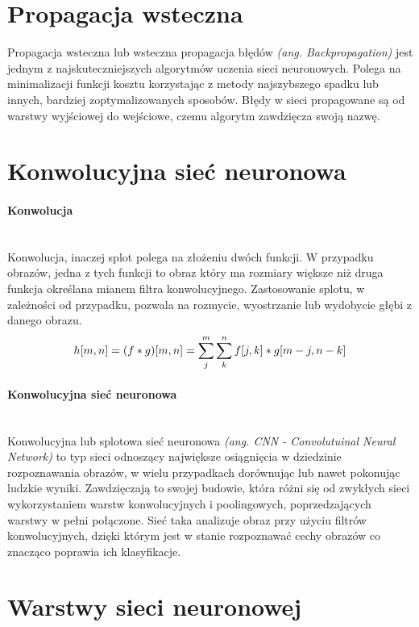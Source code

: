 \section{Propagacja wsteczna}
Propagacja wsteczna lub wsteczna propagacja błędów \textit{(ang. Backpropagation)}
jest jednym z najskuteczniejszych algorytmów uczenia sieci neuronowych. Polega
na minimalizacji funkcji kosztu korzystając z metody najszybszego spadku lub
innych, bardziej zoptymalizowanych sposobów. Błędy w sieci propagowane są od warstwy wyjściowej
do wejściowe, czemu algorytm zawdzięcza swoją nazwę.

\section{Konwolucyjna sieć neuronowa}
\paragraph{Konwolucja} \mbox{}\\
Konwolucja, inaczej splot polega na złożeniu dwóch funkcji. W przypadku obrazów,
jedna z tych funkcji to obraz który ma rozmiary większe niż druga funkcja określana
mianem filtra konwolucyjnego. Zastosowanie splotu, w zależności od przypadku,
pozwala na rozmycie, wyostrzanie lub wydobycie głębi z danego obrazu.
\begin{equation}
h[m, n] = (f * g)[m, n] = \sum_j^m \sum_k^n f[j, k] * g[m-j, n-k] \\
\end{equation}

\paragraph{Konwolucyjna sieć neuronowa} \mbox{}\\
Konwolucyjna lub splotowa sieć neuronowa \textit{(ang. CNN - Convolutuinal Neural Network)}
to typ sieci odnoszący największe osiągnięcia w dziedzinie rozpoznawania obrazów,
w wielu przypadkach dorównując lub nawet pokonując ludzkie wyniki. Zawdzięczają to
swojej budowie, która różni się od zwykłych sieci wykorzystaniem warstw konwolucyjnych
i poolingowych, poprzedzających warstwy w pełni połączone. Sieć taka analizuje obraz
przy użyciu filtrów konwolucyjnych, dzięki którym jest w stanie rozpoznawać cechy
obrazów co znacząco poprawia ich klasyfikacje.

\section{Warstwy sieci neuronowej}
